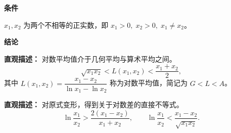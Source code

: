 \begin{statementbox}

\textbf{\textcolor{CStatement}{条件}}
\begin{description}[style=nextline, leftmargin=2.8em, labelsep=0.5em, itemsep=0.35em]
    \item[\textbf{\textcolor{CStatement}{条件 1（两正不等）}}] $x_1, x_2$ 为两个不相等的正实数，即 $x_1>0,\; x_2>0,\; x_1 \neq x_2$。
\end{description}

\textbf{\textcolor{CStatement}{结论}}
\begin{description}[style=nextline, leftmargin=2.em, labelsep=0.5em, itemsep=0.45em]
    \item[\textbf{\textcolor{CStatement}{结论一（均值链）}}]
    \textbf{\textcolor{CStatement}{直观描述：}} 对数平均值介于几何平均与算术平均之间。
    \[
    \sqrt{x_1 x_2} < L(x_1, x_2) < \frac{x_1 + x_2}{2},
    \]
    其中 $L(x_1, x_2) = \dfrac{x_1 - x_2}{\ln x_1 - \ln x_2}$ 称为对数平均值，简记为 $G < L < A$。

    \item[\textbf{\textcolor{CStatement}{推广结论（等价式）}}]
    \textbf{\textcolor{CStatement}{直观描述：}} 对原式变形，得到关于对数差的直接不等式。
    \[
    \ln\frac{x_1}{x_2} > \frac{2(x_1 - x_2)}{x_1 + x_2},
    \qquad
    \ln\frac{x_1}{x_2} < \frac{x_1 - x_2}{\sqrt{x_1 x_2}}.
    \]
\end{description}

\end{statementbox}
